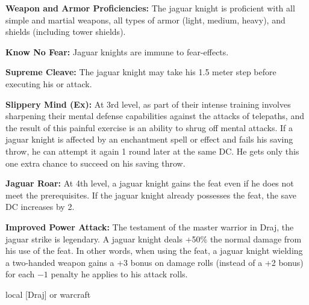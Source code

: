 {
\textbf{Weapon and Armor Proficiencies:} The jaguar knight is proficient with all simple and martial weapons, all types of armor (light, medium, heavy), and shields (including tower shields).

\textbf{Know No Fear:} Jaguar knights are immune to fear-effects.

\textbf{Supreme Cleave:} The jaguar knight may take his 1.5 meter step before executing his  or  attack.

\textbf{Slippery Mind (Ex):} At 3rd level, as part of their intense training involves sharpening their mental defense capabilities against the attacks of telepaths, and the result of this painful exercise is an ability to shrug off mental attacks. If a jaguar knight is affected by an enchantment spell or effect and fails his saving throw, he can attempt it again 1 round later at the same DC. He gets only this one extra chance to succeed on his saving throw.

\textbf{Jaguar Roar:} At 4th level, a jaguar knight gains the  feat even if he does not meet the prerequisites. If the jaguar knight already possesses the  feat, the save DC increases by 2.

\textbf{Improved Power Attack:} The testament of the master warrior in Draj, the jaguar strike is legendary. A jaguar knight deals +50\% the normal damage from his use of the  feat. In other words, when using the  feat, a jaguar knight wielding a two-handed weapon gains a +3 bonus on damage rolls (instead of a +2 bonus) for each $-1$ penalty he applies to his attack rolls.
}
{}
{local [Draj] or warcraft}
{}
{}
{}